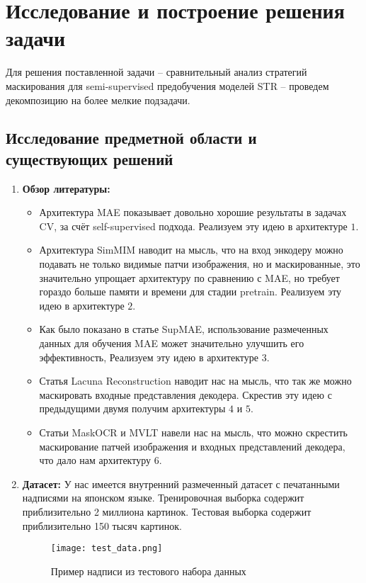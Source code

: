 \section{Исследование и построение решения задачи}
\label{sec:Chapter3} 

Для решения поставленной задачи – сравнительный анализ стратегий маскирования для semi-supervised предобучения моделей STR – проведем декомпозицию на более мелкие подзадачи.

\subsection{Исследование предметной области и существующих решений}



\begin{enumerate}
     \item  \textbf{Обзор литературы:}
     \begin{itemize}
          \item Архитектура MAE показывает довольно хорошие результаты в задачах CV, за счёт self-supervised подхода. Реализуем эту идею в архитектуре $1$.

          \item Архитектура SimMIM наводит на мысль, что на вход энкодеру можно подавать не только видимые патчи изображения, но и маскированные, это значительно упрощает архитектуру по сравнению с MAE, но требует гораздо больше памяти и времени для стадии pretrain. Реализуем эту идею в архитектуре $2$.
      
          \item Как было показано в статье SupMAE, использование размеченных данных для обучения MAE может значительно улучшить его эффективность, Реализуем эту идею в архитектуре $3$. 

          \item Статья Lacuna Reconstruction наводит нас на мысль, что так же можно маскировать входные представления декодера. Скрестив эту идею с предыдущими двумя получим архитектуры $4$ и $5$.
          
          \item Статьи MaskOCR и MVLT навели нас на мысль, что можно скрестить маскирование  патчей  изображения и входных представлений декодера, что дало нам архитектуру $6$.
     \end{itemize}


     \item  \textbf{Датасет:}
      У нас имеется внутренний размеченный датасет с печатанными надписями на японском языке. Тренировочная выборка содержит приблизительно 2 миллиона картинок. Тестовая выборка содержит приблизительно 150 тысяч картинок.
      \begin{figure}[h!]
          \centering
          \texttt{[image: test\_data.png]}
          \caption{Пример надписи из тестового набора данных}
      \end{figure}
     


\end{enumerate}
